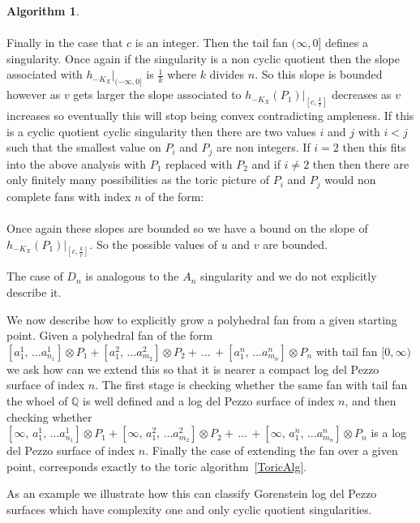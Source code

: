 \documentclass[12pt,a4paper]{book}      %
\theoremstyle{definition}
\newtheorem{algorithm}{Algorithm}
\newcommand{\mb}[1]{\mathbb{#1}}
\begin{document}
\begin{algorithm}
 \\
 \\
 Finally in the case that $c$ is an integer. Then the tail fan $(\infty, 0]$ defines a singularity. Once again if the singularity is a non cyclic quotient then the slope associated with $h_{-K_X}|_{(-\infty, 0]}$ is $\frac{1}{k}$ where $k$ divides $n$. So this slope is bounded however 
as $v$ gets larger the slope associated to $h_{-K_X}(P_1)|_{[c, \frac{k}{v}]}$ decreases as $v$ increases so eventually this will stop being convex contradicting ampleness. If this is a  cyclic quotient cyclic singularity then there are two values $i$ and $j$ with $i<j$ such that the smallest value on $P_i$ and $P_j$ are non integers. If $i = 2$ then this fits into the above analysis with $P_1$ replaced with $P_2$ and if $i \neq 2$ then then there are only finitely many possibilities as the toric picture of $P_i$ and $P_j$ would non complete fans with index $n$ of the form:
\\
\\
Once again these slopes are bounded so we have a bound on the slope of $h_{-K_X}(P_1)|_{[c, \frac{k}{v}]}$. So the possible values of $u$ and $v$ are bounded.

The case of $D_n$ is analogous to the $A_n$ singularity and we do not explicitly describe it. 

We now describe how to explicitly grow a polyhedral fan from a given starting point. Given a polyhedral fan of the form $[a^1_1, \, \dots a^1_{n_1}] \otimes P_1 + [a^2_1, \, \dots a^2_{m_2}] \otimes P_2 + \, \dots \, + [a^n_1, \, \dots a^n_{m_n}] \otimes P_n$ with tail fan $[0, \infty)$ we ask how can we extend this so that it is nearer a compact log del Pezzo surface of index $n$. The first stage is checking whether the same fan with tail fan the whoel of $\mb{Q}$ is well defined and a log del Pezzo surface of index $n$, and then checking whether $[\infty , \, a^1_1, \, \dots a^1_{n_1}] \otimes P_1 + [\infty, \, a^2_1, \, \dots a^2_{m_2}] \otimes P_2 + \, \dots \, + [\infty , \, a^n_1, \, \dots a^n_{m_n}] \otimes P_n$ is a log del Pezzo surface of index $n$. Finally the case of extending the fan over a given point, corresponds exactly to the toric algorithm~\ref{ToricAlg}. 
\end{algorithm}



As an example we illustrate how this can classify Gorenstein log del Pezzo surfaces which have complexity one and only cyclic quotient singularities.
\end{document}
